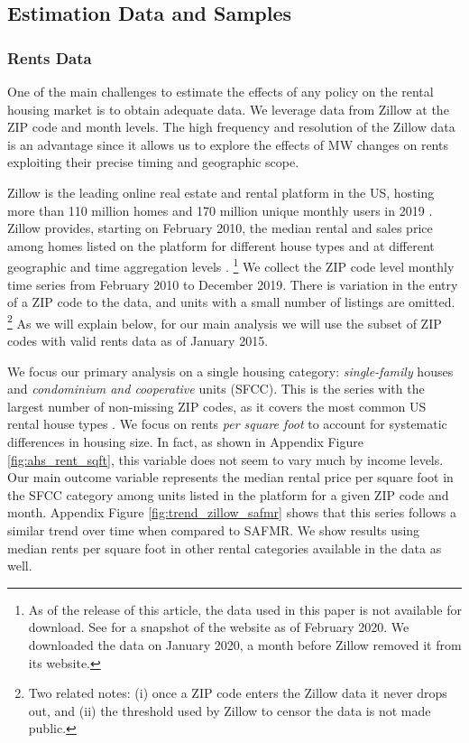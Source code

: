 \subsection{Estimation Data and Samples}

\subsubsection{Rents Data}
\label{sec:data_rents}

One of the main challenges to estimate the effects of any policy on the rental
housing market is to obtain adequate data.
We leverage data from Zillow at the ZIP code and month levels.
The high frequency and resolution of the Zillow data is an advantage since it 
allows us to explore the effects of MW changes on rents exploiting their precise
timing and geographic scope. 

Zillow is the leading online real estate and rental platform in the US, hosting
more than 110 million homes and 170 million unique monthly users in 2019 
\parencite{ZillowFacts}.
Zillow provides, starting on February 2010, the median rental and sales price 
among homes listed on the platform for different house types and at different 
geographic and time aggregation levels \parencite{ZillowData}.%
\footnote{As of the release of this article, the data used in this paper is not 
available for download.
See \textcite{ZillowDataArchive} for a snapshot of the website as of 
February 2020.
We downloaded the data on January 2020, a month before Zillow removed it from
its website.} 
We collect the ZIP code level monthly time series from February 2010 to 
December 2019. 
There is variation in the entry of a ZIP code to the data, and units with a small 
number of listings are omitted.%
\footnote{Two related notes:
(i) once a ZIP code enters the Zillow data it never drops out, and
(ii) the threshold used by Zillow to censor the data is not made public.}
As we will explain below, for our main analysis we will use the subset of ZIP 
codes with valid rents data as of January 2015.

We focus our primary analysis on a single housing category:
\textit{single-family} houses and \textit{condominium and cooperative} units (SFCC).
This is the series with the largest number of non-missing ZIP codes, as it 
covers the most common US rental house types \parencite{Fernald2020}.
We focus on rents \textit{per square foot} to account for systematic differences
in housing size.
In fact, as shown in Appendix Figure \ref{fig:ahs_rent_sqft}, this variable does 
not seem to vary much by income levels.
Our main outcome variable represents the median rental price per square foot in 
the SFCC category among units listed in the platform for a given ZIP code and 
month.
Appendix Figure \ref{fig:trend_zillow_safmr} shows that this series follows a 
similar trend over time when compared to SAFMR.
We show results using median rents per square foot in other rental categories 
available in the data as well.

